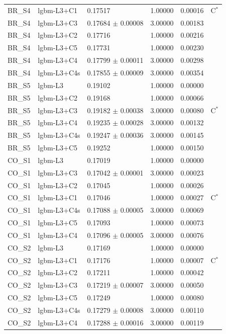 \begin{tabular}{lllrrl}
BR\_S4 & lgbm-L3+C1 & 0.17517 & 1.00000 & 0.00016 & C$^{*}$ \\
BR\_S4 & lgbm-L3+C3 & 0.17684 $\pm$ 0.00008 & 3.00000 & 0.00183 &  \\
BR\_S4 & lgbm-L3+C2 & 0.17716 & 1.00000 & 0.00216 &  \\
BR\_S4 & lgbm-L3+C5 & 0.17731 & 1.00000 & 0.00230 &  \\
BR\_S4 & lgbm-L3+C4 & 0.17799 $\pm$ 0.00011 & 3.00000 & 0.00298 &  \\
BR\_S4 & lgbm-L3+C4s & 0.17855 $\pm$ 0.00009 & 3.00000 & 0.00354 &  \\
BR\_S5 & lgbm-L3 & 0.19102 & 1.00000 & 0.00000 &  \\
BR\_S5 & lgbm-L3+C2 & 0.19168 & 1.00000 & 0.00066 &  \\
BR\_S5 & lgbm-L3+C3 & 0.19182 $\pm$ 0.00038 & 3.00000 & 0.00080 & C$^{*}$ \\
BR\_S5 & lgbm-L3+C4 & 0.19235 $\pm$ 0.00028 & 3.00000 & 0.00132 &  \\
BR\_S5 & lgbm-L3+C4s & 0.19247 $\pm$ 0.00036 & 3.00000 & 0.00145 &  \\
BR\_S5 & lgbm-L3+C5 & 0.19252 & 1.00000 & 0.00150 &  \\
CO\_S1 & lgbm-L3 & 0.17019 & 1.00000 & 0.00000 &  \\
CO\_S1 & lgbm-L3+C3 & 0.17042 $\pm$ 0.00001 & 3.00000 & 0.00023 &  \\
CO\_S1 & lgbm-L3+C2 & 0.17045 & 1.00000 & 0.00026 &  \\
CO\_S1 & lgbm-L3+C1 & 0.17046 & 1.00000 & 0.00027 & C$^{*}$ \\
CO\_S1 & lgbm-L3+C4s & 0.17088 $\pm$ 0.00005 & 3.00000 & 0.00069 &  \\
CO\_S1 & lgbm-L3+C5 & 0.17093 & 1.00000 & 0.00073 &  \\
CO\_S1 & lgbm-L3+C4 & 0.17096 $\pm$ 0.00005 & 3.00000 & 0.00076 &  \\
CO\_S2 & lgbm-L3 & 0.17169 & 1.00000 & 0.00000 &  \\
CO\_S2 & lgbm-L3+C1 & 0.17176 & 1.00000 & 0.00007 & C$^{*}$ \\
CO\_S2 & lgbm-L3+C2 & 0.17211 & 1.00000 & 0.00042 &  \\
CO\_S2 & lgbm-L3+C3 & 0.17219 $\pm$ 0.00007 & 3.00000 & 0.00050 &  \\
CO\_S2 & lgbm-L3+C5 & 0.17249 & 1.00000 & 0.00080 &  \\
CO\_S2 & lgbm-L3+C4s & 0.17279 $\pm$ 0.00008 & 3.00000 & 0.00110 &  \\
CO\_S2 & lgbm-L3+C4 & 0.17288 $\pm$ 0.00016 & 3.00000 & 0.00119 &  \\

\end{tabular}
